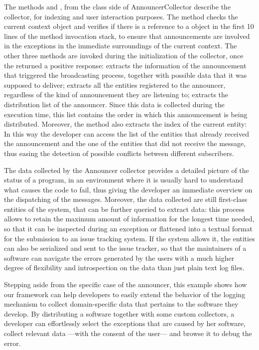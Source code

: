 The methods  and , from the class side of AnnouncerCollector describe the collector, for indexing and user interaction purposes.
The method  checks the current context object and verifies if there is a reference to a  object in the first 10 lines of the method invocation stack, to ensure that announcements are involved in the exceptions in the immediate surroundings of the current context.
The other three methods are invoked during the initialization of the collector, once the  returned a positive response:
 extracts the information of the announcement that triggered the broadcasting process, together with possible data that it was supposed to deliver;
 extracts all the entities registered to the announcer, regardless of the kind of announcement they are listening to;
 extracts the distribution list of the announcer.
Since this data is collected during the execution time, this list contains the order in which this announcement is being distributed.
Moreover, the method also extracts the index of the current entity: In this way the developer can access the list of the entities that already received the announcement and the one of the entities that did not receive the message, thus easing the detection of possible conflicts between different subscribers.

The data collected by the Announcer collector provides a detailed picture of the status of a program, in an environment where it is usually hard to understand what causes the code to fail, thus giving the developer an immediate overview on the dispatching of the messages.
Moreover, the data collected are still first-class entities of the system, that can be further queried to extract data: this process allows to retain the maximum amount of information for the longest time needed, so that it can be inspected during an exception or flattened into a textual format for the submission to an issue tracking system.
If the system allows it, the entities can also be serialized and sent to the issue tracker, so that the maintainers of a software can navigate the errors generated by the users with a much higher degree of flexibility and introspection on the data than just plain text log files.

Stepping aside from the specific case of the announcer, this example shows how our framework can help developers to easily extend the behavior of the logging mechanism to collect domain-specific data that pertains to the software they develop.
By distributing a software together with some custom collectors, a developer can effortlessly select the exceptions that are caused by her software, collect relevant data ---with the consent of the user--- and browse it to debug the error.

